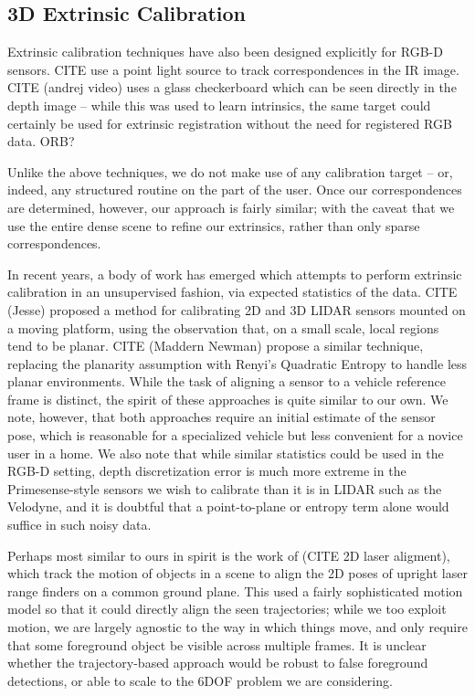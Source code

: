 \documentclass[letterpaper, 10 pt, conference]{ieeeconf}  %
\begin{document}
\subsection{3D Extrinsic Calibration}

Extrinsic calibration techniques have also been designed explicitly for RGB-D sensors. CITE use a 
point light source to track correspondences in the IR image. CITE (andrej video) uses a glass checkerboard 
which can be seen directly in the depth image -- while this was used to learn intrinsics, the same target 
could certainly be used for extrinsic registration without the need for registered RGB data. ORB?

Unlike the above techniques, we do not make use of any calibration target -- or, indeed, any structured routine 
on the part of the user. Once our correspondences are determined, however, our approach is fairly similar; with 
the caveat that we use the entire dense scene to refine our extrinsics, rather than only sparse correspondences.

In recent years, a body of work has emerged which attempts to perform extrinsic calibration in an unsupervised 
fashion, via expected statistics of the data. CITE (Jesse) proposed a method for calibrating 2D and 3D LIDAR sensors mounted on a moving platform, 
using the observation that, on a small scale, local regions tend to be planar. CITE (Maddern Newman) propose 
a similar technique, replacing the planarity assumption with Renyi's Quadratic Entropy to handle less planar environments. 
While the task of aligning a sensor to a vehicle reference frame is distinct, the spirit of these approaches is quite 
similar to our own. We note, however, that both approaches require an initial estimate of the sensor pose, which is 
reasonable for a specialized vehicle but less convenient for a novice user in a home. We also 
note that while similar statistics could be used in the RGB-D setting, depth discretization error is much more 
extreme in the Primesense-style sensors we wish to calibrate than it is in LIDAR such as the Velodyne, and it is doubtful that a point-to-plane or entropy term alone would suffice in such noisy data.

Perhaps most similar to ours in spirit is the work of (CITE 2D laser aligment), which track the motion of objects in a 
scene to align the 2D poses of upright laser range finders on a common ground plane. This used a fairly sophisticated motion model so that it could directly 
align the seen trajectories; while we too exploit motion, we are largely agnostic to the way in which things move, and only require that some 
foreground object be visible across multiple frames. It is unclear whether the trajectory-based approach would 
be robust to false foreground detections, or able to scale to the 6DOF problem we are considering.
\end{document}
